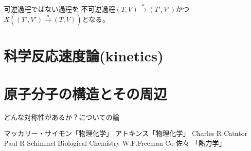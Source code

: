 \documentclass{ltjsarticle}
\begin{document}
可逆過程ではない過程を
不可逆過程\((T,V)\xrightarrow{a}(T',V')\)かつ\(X((T',V')\xrightarrow{a}(T,V))\)となる。





\part{科学反応速度論(kinetics)}




\part{原子分子の構造とその周辺}
どんな対称性があるか？についての論


\begin{thebibliography}{9}
 マッカリー・サイモン「物理化学」
 アトキンス「物理化学」
 Charles R Catntor Paul R Schimmel Biological Chemistry W.F.Freeman Co 
 佐々 「熱力学」
\end{thebibliography}
\end{document}
